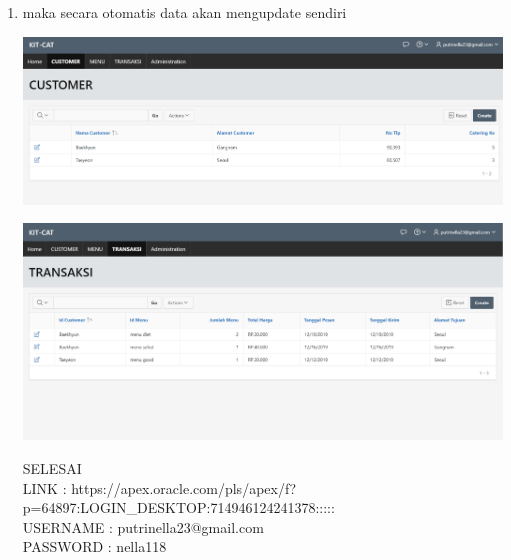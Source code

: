 \documentclass[a4paper, 12pt]{article}
\begin{document}
\begin{enumerate}
\begin{center}
\end{center}
\item maka secara otomatis data akan mengupdate sendiri 
\begin{center}
    \includegraphics[width=.8\textwidth]{figure/13.PNG}
\end{center}
\begin{center}
    \includegraphics[width=.8\textwidth]{figure/14.PNG}
\end{center}
SELESAI\\
LINK : https://apex.oracle.com/pls/apex/f?p=64897:LOGIN_DESKTOP:714946124241378::::: \\
USERNAME : putrinella23@gmail.com \\
PASSWORD : nella118
\end{enumerate}
\end{document}
